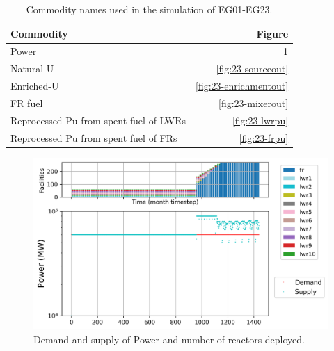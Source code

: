 \documentclass[11pt]{article}
\begin{document}
\begin{table}[H]
	\centering
	\caption{Commodity names used in the simulation of EG01-EG23.}
	\label{tab:23-commodities}
	\begin{tabularx}{\textwidth}{lR}
		\hline
		Commodity & Figure \\ \hline
  		Power           & \ref{fig:23-power} \\
		Natural-U       & \ref{fig:23-sourceout} \\
        Enriched-U   	& \ref{fig:23-enrichmentout} \\
        FR fuel       	& \ref{fig:23-mixerout} \\
  		Reprocessed Pu from spent fuel of LWRs & \ref{fig:23-lwrpu} \\
  		Reprocessed Pu from spent fuel of FRs  & \ref{fig:23-frpu} \\ \hline
	\end{tabularx}
\end{table}

\begin{figure}[H]
	\centering
	\includegraphics[width=\textwidth]{23-figures/0-poly-power.png} 
	\hfill
	\caption{Demand and supply of Power and number of reactors deployed.}
	\label{fig:23-power}
\end{figure}
\end{document}
